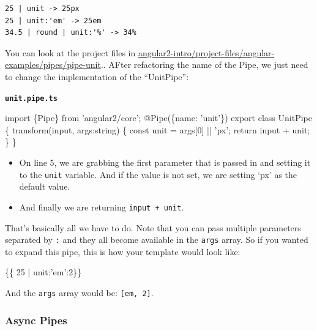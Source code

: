 \documentclass[12pt,]{article}
\newenvironment{Shaded}{}{}
\newcommand{\KeywordTok}[1]{\textcolor[rgb]{0.00,0.00,1.00}{{#1}}}
\newcommand{\DataTypeTok}[1]{{#1}}
\newcommand{\DecValTok}[1]{{#1}}
\newcommand{\FunctionTok}[1]{{#1}}
\newcommand{\NormalTok}[1]{{#1}}
\providecommand{\tightlist}{%
  \setlength{\itemsep}{0pt}\setlength{\parskip}{0pt}}
\begin{document}
\begin{verbatim}
25 | unit -> 25px
25 | unit:'em' -> 25em
34.5 | round | unit:'%' -> 34%
\end{verbatim}

You can look at the project files in
\href{https://github.com/st32lth/angular2-intro/tree/master/project-files/angular-examples/pipes/pipe-unit}{angular2-intro/project-files/angular-examples/pipes/pipe-unit}..
AFter refactoring the name of the Pipe, we just need to change the
implementation of the ``UnitPipe'':

\textbf{\texttt{unit.pipe.ts}}

\begin{Shaded}
\begin{Highlighting}[numbers=left,,]
\KeywordTok{import \{Pipe\} from 'angular2/core';}
\FunctionTok{@Pipe}\NormalTok{(\{name: 'unit'\})}
\NormalTok{export }\KeywordTok{class} \NormalTok{UnitPipe \{}
  \FunctionTok{transform}\NormalTok{(input, args:string) \{}
    \DataTypeTok{const} \NormalTok{unit = args[}\DecValTok{0}\NormalTok{] || 'px';}
    \KeywordTok{return} \NormalTok{input + unit;}
  \NormalTok{\}}
\NormalTok{\}}
\end{Highlighting}
\end{Shaded}

\begin{itemize}
\tightlist
\item
  On line 5, we are grabbing the first parameter that is passed in and
  setting it to the \texttt{unit} variable. And if the value is not set,
  we are setting `px' as the default value.
\item
  And finally we are returning \texttt{input\ +\ unit}.
\end{itemize}

That's basically all we have to do. Note that you can pass multiple
parameters separated by \texttt{:} and they all become available in the
\texttt{args} array. So if you wanted to expand this pipe, this is how
your template would look like:

\begin{Shaded}
\begin{Highlighting}[numbers=left,,]
\NormalTok{\{\{ 25 | unit:'em':2\}\}}
\end{Highlighting}
\end{Shaded}

And the \texttt{args} array would be:
\texttt{{[}\textquotesingle{}em\textquotesingle{},\ 2{]}}.

\subsubsection{Async Pipes}\label{async-pipes}
\end{document}
